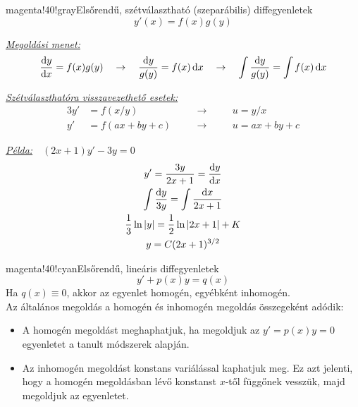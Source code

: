 \documentclass[main.tex]{subfiles}
\begin{document}
\begin{cbox}{magenta!40!gray}{Elsőrendű, szétválasztható (szeparábilis) diffegyenletek}
  \[
    y'(x) = f(x)g(y)
  \]

  \emph{\underline{Megoldási menet:}}
  \[
    \derivative{y}{x} = f(x)g(y)
    \quad \rightarrow \quad
    \frac{\differential y}{g(y)} = f(x) \, \differential x
    \quad \rightarrow \quad
    \int \frac{\differential y}{g(y)} = \int f(x) \, \differential x
  \]

  \emph{\underline{Szétválaszthatóra visszavezethető esetek:}}
  \begin{alignat*}{3}
    y'
          & = f(x/y)
    \quad &                  & \rightarrow \quad
          &                  & u = y/x
    \\
    y'
          & = f(ax + by + c)
    \quad &                  & \rightarrow \quad
          &                  & u = ax + by + c
  \end{alignat*}

  \emph{\underline{Példa:}}$\quad (2x+1)y'-3y=0$
  \begin{gather*}
    y' = \frac{3y}{2x + 1} = \derivative{y}{x}
    \\
    \int \frac{\differential y}{3y} = \int \frac{\differential x}{2x + 1}
    \\
    \frac{1}{3} \ln |y| = \frac{1}{2} \ln |2x + 1| + K
    \\
    y = C(2x + 1)^{3/2}
  \end{gather*}
\end{cbox}

\begin{cbox}{magenta!40!cyan}{Elsőrendű, lineáris diffegyenletek}
  \[
    y' + p(x) y = q(x)
  \]
  Ha $q(x) \equiv 0 $, akkor az egyenlet homogén, egyébként inhomogén.
  \\[2mm]
  Az általános megoldás a homogén és inhomogén megoldás
  összegeként adódik:
  \begin{itemize}
    \item A homogén megoldást meghaphatjuk, ha megoldjuk az
          $y' = p(x)y = 0$ egyenletet a tanult módszerek alapján.

    \item Az inhomogén megoldást konstans variálással
          kaphatjuk meg. Ez azt jelenti, hogy a homogén megoldásban
          lévő konstanst $x$-től függőnek vesszük, majd megoldjuk
          az egyenletet.
  \end{itemize}
\end{cbox}
\end{document}
